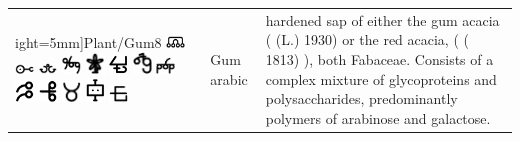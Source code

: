 \documentclass[british,final,landscape]{scrartcl}
\begin{document}
\begin{refsection}
\begin{supertabular}{p{0.3\textwidth}p{0.34\textwidth}p{0.34\textwidth}}
ight=5mm]{Plant/Gum8} \includegraphics[width=5mm]{Plant/Gum9} \includegraphics[width=5mm]{Plant/Gum10} \includegraphics[width=5mm]{Plant/Gum11} \includegraphics[width=5mm]{Plant/Gum12} \includegraphics[width=5mm]{Plant/Gum13} \includegraphics[width=5mm]{Plant/Gum14} \includegraphics[width=5mm]{Plant/Gum15} \includegraphics[width=5mm]{Plant/Gum16} \includegraphics[width=5mm]{Plant/Gum17} \includegraphics[width=5mm]{Plant/Gum18} \includegraphics[width=5mm]{Plant/Gum19} \includegraphics[width=5mm]{Plant/Gum20} \includegraphics[width=5mm]{Plant/Gum21} & Gum arabic & hardened sap of either the gum acacia ( (L.)  1930) or the red acacia, ( ( 1813) ), both Fabaceae. Consists of a complex mixture of glycoproteins and polysaccharides, predominantly polymers of arabinose and galactose. \\

\end{supertabular}
\end{refsection}
\end{document}

